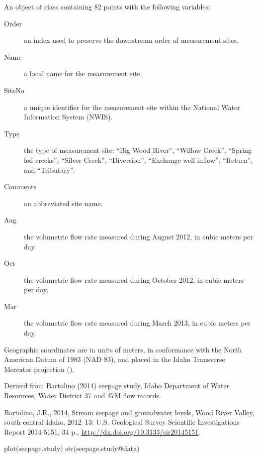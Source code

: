 \documentclass[a4paper]{book}
\begin{document}
%
\begin{Format}
An object of  class containing 82 points with the following variables:
\begin{description}

\item[Order] an index used to preserve the downstream order of measurement sites.
\item[Name] a local name for the measurement site.
\item[SiteNo] a unique identifier for the measurement site within the National Water Information System (NWIS).
\item[Type] the type of measurement site:
``Big Wood River'', ``Willow Creek'', ``Spring fed creeks'', ``Silver Creek'', ``Diversion'', ``Exchange well inflow'', ``Return'', and ``Tributary''.
\item[Comments] an abbreviated site name.
\item[Aug] the volumetric flow rate measured during August 2012, in cubic meters per day.
\item[Oct] the volumetric flow rate measured during October 2012, in cubic meters per day.
\item[Mar] the volumetric flow rate measured during March 2013, in cubic meters per day.

\end{description}

Geographic coordinates are in units of meters, in conformance with the North American Datum of 1983 (NAD 83), and placed in the
Idaho Transverse Mercator projection ().
\end{Format}
%
\begin{Source}\relax
Derived from Bartolino (2014) seepage study, Idaho Department of Water Resources, Water District 37 and 37M flow records.
\end{Source}
%
\begin{References}\relax
Bartolino, J.R., 2014, Stream seepage and groundwater levels, Wood River Valley, south-central Idaho, 2012--13: U.S. Geological Survey Scientific Investigations Report 2014-5151, 34 p., \url{http://dx.doi.org/10.3133/sir20145151}.
\end{References}
%
\begin{Examples}
\begin{ExampleCode}
plot(seepage.study)
str(seepage.study@data)
\end{ExampleCode}
\end{Examples}
\end{document}
